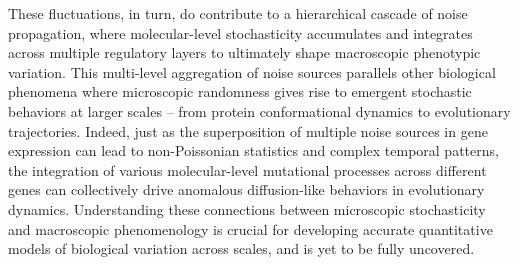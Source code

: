 These fluctuations, in turn, do contribute to a hierarchical cascade of noise propagation, where molecular-level stochasticity accumulates and integrates across multiple regulatory layers to ultimately shape macroscopic phenotypic variation. This multi-level aggregation of noise sources parallels other biological phenomena where microscopic randomness gives rise to emergent stochastic behaviors at larger scales -- from protein conformational dynamics to evolutionary trajectories. Indeed, just as the superposition of multiple noise sources in gene expression can lead to non-Poissonian statistics and complex temporal patterns, the integration of various molecular-level mutational processes across different genes can collectively drive anomalous diffusion-like behaviors in evolutionary dynamics. Understanding these connections between microscopic stochasticity and macroscopic phenomenology is crucial for developing accurate quantitative models of biological variation across scales, and is yet to be fully uncovered.

\vfill

\pagebreak



